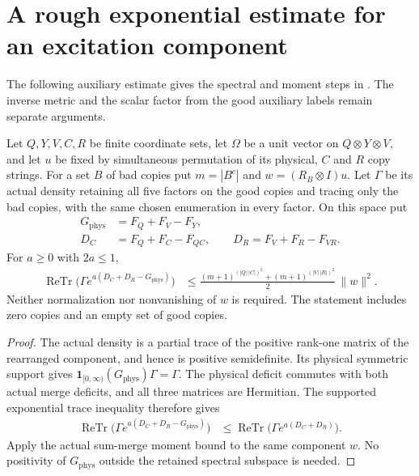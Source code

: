 \section{A rough exponential estimate for an excitation component}
\label{sec:replica_rough_component_moment}

The following auxiliary estimate gives the spectral and moment steps in
\cite[Section~7, lines~513--555]{OpenAI2026AreaLaw}. The inverse metric and
the scalar factor from the good auxiliary labels remain separate arguments.

\begin{theorem}
\label{thm:replica_rough_component_moment}
\leanok
Let $Q,Y,V,C,R$ be finite coordinate sets, let $\Omega$ be a unit vector
on $Q\otimes Y\otimes V$, and let $u$ be fixed by simultaneous permutation
of its physical, $C$ and $R$ copy strings. For a set $B$ of bad copies put
$m=|B^c|$ and $w=(R_B\otimes I)u$. Let $\Gamma$ be its actual density
retaining all five factors on the good copies and tracing only the bad
copies, with the same chosen enumeration in every factor. On this space put
\begin{align*}
 G_{\mathrm{phys}}&=F_Q+F_V-F_Y,\\
 D_C&=F_Q+F_C-F_{QC},\qquad D_R=F_V+F_R-F_{VR}.
\end{align*}
For $a\ge0$ with $2a\le1$,
\begin{align*}
 \operatorname{ReTr}\bigl(\Gamma e^{a(D_C+D_R-G_{\mathrm{phys}})}\bigr)
 &\le \frac{(m+1)^{(|Q|\,|C|)^2}+(m+1)^{(|V|\,|R|)^2}}2\,\|w\|^2.
\end{align*}
Neither normalization nor nonvanishing of $w$ is required. The statement
includes zero copies and an empty set of good copies.
\end{theorem}

\begin{proof}
\leanok
The actual density is a partial trace of the positive rank-one matrix
of the rearranged component, and hence is positive semidefinite. Its
physical symmetric support gives
$\mathbf1_{[0,\infty)}(G_{\mathrm{phys}})\Gamma=\Gamma$.
The physical deficit commutes with both actual merge deficits, and all
three matrices are Hermitian. The supported exponential trace inequality
therefore gives
\begin{align*}
 \operatorname{ReTr}\bigl(\Gamma e^{a(D_C+D_R-G_{\mathrm{phys}})}\bigr)
 &\le \operatorname{ReTr}\bigl(\Gamma e^{a(D_C+D_R)}\bigr).
\end{align*}
Apply the actual sum-merge moment bound to the same component $w$.
No positivity of $G_{\mathrm{phys}}$ outside the retained spectral subspace
is needed.
\end{proof}

